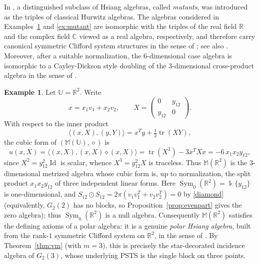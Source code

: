 \documentclass[times,11pt,reqno]{amsproc}
\theoremstyle{definition}
\newtheorem{example}[theorem]{Example}
\numberwithin{equation}{section}
\def\R#1{\mathbb{R}^{#1}}
\newcommand\fie{\Bbbk}
\def\ualg{\mathbb{U}}
\newcommand{\Id}{\operatorname{Id}}
\DeclareMathOperator{\tr}{tr}
\DeclareMathOperator{\Sym}{Sym}
\def\ualg{\mathbb{U}}
\def\malg{\mathbb{M}}
\newcommand{\vm}[1]{\malg(#1)}
\begin{document}
In \cite{Fox-Tkachev}, a distinguished subclass of Hsiang algebras, called \emph{mutants}, was introduced as the triples of classical Hurwitz algebras. The algebras considered in Examples~\ref{ex:polar3} and \ref{ex:mutant} are isomorphic with the triples of the real field $\R{}$ and the complex field $\mathbb C$ viewed as a real algebra, respectively, and therefore carry canonical symmetric Clifford system structures in the sense of \cite{Fox-Tkachev}; see also \cite[Section~6.5]{Nadirashvili-Tkachev-Vladuts}. Moreover, after a suitable normalization, the $6$-dimensional case algebra is isomorphic to a Cayley-Dickson style doubling of the $3$-dimensional cross-product algebra in the sense of \cite{FoxTka26}.


\begin{example}\label{ex:polar3}
Let $\ualg=\mathbb R^2$. Write
$$
x=x_1v_1+x_2v_2,
\qquad
X=
\begin{pmatrix}
0&y_{12}\\
y_{12}&0
\end{pmatrix}.
$$
With respect to the inner product
$$
\langle(x,X),(y,Y)\rangle
=
x^Ty+\tfrac12\tr(XY),
$$
the cubic form of $(\vm{\ualg},\diamond)$ is
$$
u(x,X)
=
\langle(x,X),(x,X)\diamond(x,X)\rangle
=
\tr(X^3)-3x^TXx
=
-6\,x_1x_2y_{12},
$$
since $X^2=y_{12}^2\Id$ is scalar, whence $X^3=y_{12}^2X$ is traceless.
Thus $\vm{\mathbb R^2}$ is the $3$-dimensional metrized algebra whose
cubic form is, up to normalization, the split product $x_1x_2y_{12}$ of
three independent linear forms. Here $\Sym_0(\mathbb R^2)=\fie\{y_{12}\}$
is one-dimensional, and $S_{12}\odot S_{12}=2\pi(v_1v_1^T+v_2v_2^T)=0$ by
\eqref{diamond} (equivalently, $G_2(2)$ has no blocks, so
Proposition~\ref{prop:evenpart} gives the zero algebra); thus
$\Sym_0(\mathbb R^2)$ is a null algebra. Consequently $\vm{\mathbb R^2}$
satisfies the defining axioms of a polar algebra: it is a genuine
\emph{polar Hsiang algebra}, built from the rank-$1$ symmetric Clifford
system on $\mathbb R^2$, in the sense of \cite{Ferus-Karcher-Munzner}. By
Theorem~\ref{thm:vm} (with $m=3$), this is precisely the star-decorated
incidence algebra of $G_2(3)$, whose underlying PSTS is the single block
on three points.
\end{example}
\end{document}
